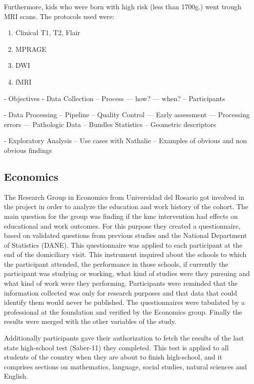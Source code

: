 Furthermore, kids who were born with high risk (less than 1700g.) went trough MRI scans. The protocols used were:

\begin{enumerate}
	\item Clinical T1, T2, Flair
	\item MPRAGE
	\item DWI
	\item fMRI	
\end{enumerate}



 - Objectives
 - Data Collection
 -- Process
 --- how?
 --- when?
 -- Participants

 
 - Data Processing
 -- Pipeline
 -- Quality Control
 --- Early assessment
 --- Processing errors
 --- Pathologic Data
 -- Bundles Statistics
 -- Geometric descriptors

 - Exploratory Analysis
 -- Use cases with Nathalie
 -- Examples of obvious and non obvious findings


\subsection{Economics}

The Research Group in Economics from Universidad del Rosario got involved in the project in order to analyze the education and work history of the cohort. The main question for the group was finding if the kmc intervention had effects on educational and work outcomes.  For this purpose they created a questionnaire, based on validated questions from previous studies and the National Department of Statistics (DANE). This questionnaire was applied to each participant at the end of the domiciliary visit. This instrument inquired about the schools to which the participant attended, the performance in those schools, if currently the participant was studying or working, what kind of studies were they pursuing and what kind of work were they performing. Participants were reminded that the information collected was only for research purposes and that data that could identify them would never be published. The questionnaires were tabulated by a professional at the foundation and verified by the Economics group. Finally the results were merged with the other variables of the study.

Additionally participants gave their authorization to fetch the results of the last state high-school test (Saber-11) they completed. This test is applied to all students of the country when they are about to finish high-school, and it comprises sections on mathematics, language, social studies, natural sciences and English.


